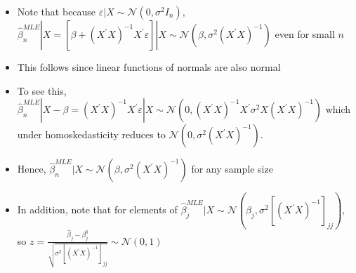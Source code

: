 \documentclass[notes=show]{beamer}
\begin{document}
\begin{frame}%


\begin{itemize}
\item Note that because $\varepsilon |X\sim \mathcal{N}\left( 0,\sigma
^{2}I_{n}\right) ,$ $\hat{\beta}_{n}^{MLE}|X=\left[ \beta +\left( X^{\prime
}X\right) ^{-1}X^{\prime }\varepsilon \right] |X\sim \mathcal{N}\left( \beta
,\sigma ^{2}\left( X^{\prime }X\right) ^{-1}\right) $ even for small $n$

\item This follows since linear functions of normals are also normal

\item To see this, $\hat{\beta}_{n}^{MLE}|X-\beta =\left( X^{\prime
}X\right) ^{-1}X^{\prime }\varepsilon |X\sim \mathcal{N}\left( 0,\left(
X^{\prime }X\right) ^{-1}X^{\prime }\sigma ^{2}X\left( X^{\prime }X\right)
^{-1}\right) $ which under homoskedasticity reduces to $\mathcal{N}\left(
0,\sigma ^{2}\left( X^{\prime }X\right) ^{-1}\right) .$

\item Hence, $\hat{\beta}_{n}^{MLE}|X\sim \mathcal{N}\left( \beta ,\sigma
^{2}\left( X^{\prime }X\right) ^{-1}\right) $ for any sample size

\item In addition, note that for elements of $\hat{\beta}_{j}^{MLE}|X\sim 
\mathcal{N}\left( \beta _{j},\sigma ^{2}\left[ \left( X^{\prime }X\right)
^{-1}\right] _{jj}\right) ,$ so $z=\frac{\widehat{\beta }_{j}-\beta _{j}^{0}%
}{\sqrt{\sigma ^{2}\left[ \left( X^{\prime }X\right) ^{-1}\right] _{jj}}}%
\sim \mathcal{N}(0,1)$
\end{itemize}

\end{frame}%
\end{document}
